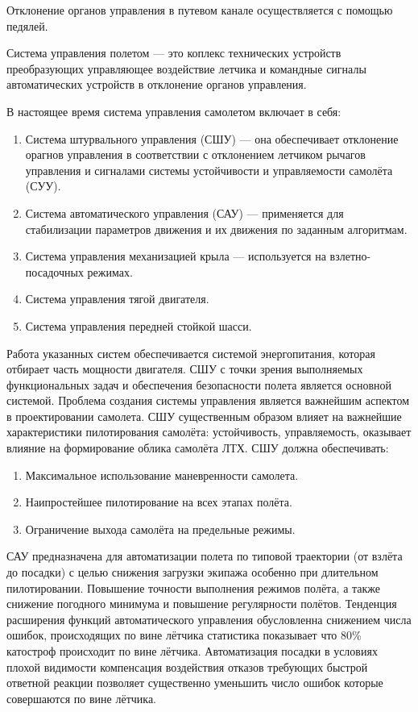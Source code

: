 \documentclass{article}
\begin{document}
Отклонение органов управления в путевом канале осуществляется с помощью педялей.

Система управления полетом — это коплекс технических устройств преобразующих управляющее воздействие летчика и командные сигналы автоматических устройств в отклонение органов управления. 

В настоящее время система управления самолетом включает в себя:
\begin{enumerate}
	\item Система штурвального управления (СШУ) --- она обеспечивает отклонение орагнов управления в соответствии с отклонением летчиком рычагов управления и сигналами системы устойчивости и управляемости самолёта (СУУ).
	\item Система автоматического управления (САУ) --- применяется для стабилизации параметров движения и их движения по заданным алгоритмам.
	\item Система управления механизацией крыла --- используется на взлетно-посадочных режимах.
	\item Система управления тягой двигателя.
	\item Система управления передней стойкой шасси.
\end{enumerate}

Работа указанных систем обеспечивается системой энергопитания, которая отбирает часть мощности двигателя. СШУ с точки зрения выполняемых функциональных задач и обеспечения безопасности полета является основной системой. Проблема создания системы управления является важнейшим аспектом в проектировании самолета. СШУ существенным образом влияет на важнейшие характеристики пилотирования самолёта: устойчивость, управляемость, оказывает влияние на формирование облика самолёта ЛТХ. СШУ должна обеспечивать:
\begin{enumerate}
	\item Максимальное использование маневренности самолета.
	\item Наипростейшее пилотирование на всех этапах полёта.
	\item Ограничение выхода самолёта на предельные режимы.
\end{enumerate}

САУ предназначена для автоматизации полета по типовой траектории (от взлёта до посадки) с целью снижения загрузки экипажа особенно при длительном пилотировании. Повышение точности выполнения режимов полёта, а также снижение погодного минимума и повышение регулярности полётов. Тенденция расширения функций автоматического управления обусловленна снижением числа ошибок, происходящих по вине лётчика статистика показывает что 80\% катостроф происходит по вине лётчика. Автоматизация посадки в условиях плохой видимости компенсация воздействия отказов требующих быстрой ответной реакции позволяет существенно уменьшить число ошибок которые совершаются по вине лётчика.
\end{document}
